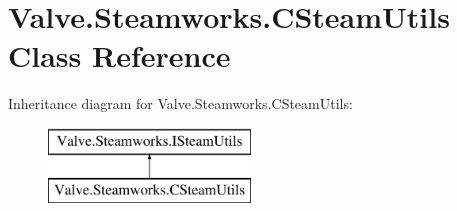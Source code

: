 \hypertarget{classValve_1_1Steamworks_1_1CSteamUtils}{}\section{Valve.\+Steamworks.\+C\+Steam\+Utils Class Reference}
\label{classValve_1_1Steamworks_1_1CSteamUtils}
Inheritance diagram for Valve.\+Steamworks.\+C\+Steam\+Utils\+:\begin{figure}[H]
\begin{center}
\leavevmode
\includegraphics[height=2.000000cm]{classValve_1_1Steamworks_1_1CSteamUtils}
\end{center}
\end{figure}
